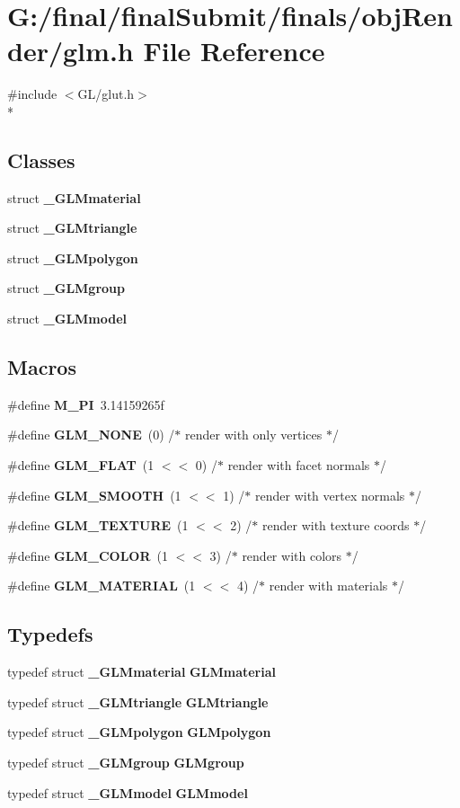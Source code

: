 \section{G\-:/final/final\-Submit/finals/obj\-Render/glm.h File Reference}
\label{glm_8h}
{\ttfamily \#include $<$G\-L/glut.\-h$>$}\\*
\subsection*{Classes}
\begin{DoxyCompactItemize}
\item 
struct {\bf \-\_\-\-G\-L\-Mmaterial}
\item 
struct {\bf \-\_\-\-G\-L\-Mtriangle}
\item 
struct {\bf \-\_\-\-G\-L\-Mpolygon}
\item 
struct {\bf \-\_\-\-G\-L\-Mgroup}
\item 
struct {\bf \-\_\-\-G\-L\-Mmodel}
\end{DoxyCompactItemize}
\subsection*{Macros}
\begin{DoxyCompactItemize}
\item 
\#define {\bf M\-\_\-\-P\-I}~3.\-14159265f
\item 
\#define {\bf G\-L\-M\-\_\-\-N\-O\-N\-E}~(0)            /$\ast$ render with only vertices $\ast$/
\item 
\#define {\bf G\-L\-M\-\_\-\-F\-L\-A\-T}~(1 $<$$<$ 0)       /$\ast$ render with facet normals $\ast$/
\item 
\#define {\bf G\-L\-M\-\_\-\-S\-M\-O\-O\-T\-H}~(1 $<$$<$ 1)       /$\ast$ render with vertex normals $\ast$/
\item 
\#define {\bf G\-L\-M\-\_\-\-T\-E\-X\-T\-U\-R\-E}~(1 $<$$<$ 2)       /$\ast$ render with texture coords $\ast$/
\item 
\#define {\bf G\-L\-M\-\_\-\-C\-O\-L\-O\-R}~(1 $<$$<$ 3)       /$\ast$ render with colors $\ast$/
\item 
\#define {\bf G\-L\-M\-\_\-\-M\-A\-T\-E\-R\-I\-A\-L}~(1 $<$$<$ 4)       /$\ast$ render with materials $\ast$/
\end{DoxyCompactItemize}
\subsection*{Typedefs}
\begin{DoxyCompactItemize}
\item 
typedef struct {\bf \-\_\-\-G\-L\-Mmaterial} {\bf G\-L\-Mmaterial}
\item 
typedef struct {\bf \-\_\-\-G\-L\-Mtriangle} {\bf G\-L\-Mtriangle}
\item 
typedef struct {\bf \-\_\-\-G\-L\-Mpolygon} {\bf G\-L\-Mpolygon}
\item 
typedef struct {\bf \-\_\-\-G\-L\-Mgroup} {\bf G\-L\-Mgroup}
\item 
typedef struct {\bf \-\_\-\-G\-L\-Mmodel} {\bf G\-L\-Mmodel}
\end{DoxyCompactItemize}
